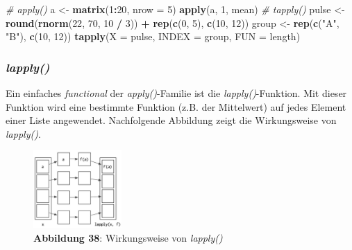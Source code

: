 \documentclass[]{article}
\newenvironment{Shaded}{\begin{snugshade}}{\end{snugshade}}
\newcommand{\KeywordTok}[1]{\textcolor[rgb]{0.13,0.29,0.53}{\textbf{#1}}}
\newcommand{\DataTypeTok}[1]{\textcolor[rgb]{0.13,0.29,0.53}{#1}}
\newcommand{\DecValTok}[1]{\textcolor[rgb]{0.00,0.00,0.81}{#1}}
\newcommand{\StringTok}[1]{\textcolor[rgb]{0.31,0.60,0.02}{#1}}
\newcommand{\CommentTok}[1]{\textcolor[rgb]{0.56,0.35,0.01}{\textit{#1}}}
\newcommand{\OperatorTok}[1]{\textcolor[rgb]{0.81,0.36,0.00}{\textbf{#1}}}
\newcommand{\NormalTok}[1]{#1}
\begin{document}
\begin{Shaded}
\begin{Highlighting}[]
  \CommentTok{# apply()}
\NormalTok{  a <-}\StringTok{ }\KeywordTok{matrix}\NormalTok{(}\DecValTok{1}\OperatorTok{:}\DecValTok{20}\NormalTok{, }\DataTypeTok{nrow =} \DecValTok{5}\NormalTok{)}
  \KeywordTok{apply}\NormalTok{(a, }\DecValTok{1}\NormalTok{, mean)}
  \CommentTok{# tapply()}
\NormalTok{  pulse <-}\StringTok{ }\KeywordTok{round}\NormalTok{(}\KeywordTok{rnorm}\NormalTok{(}\DecValTok{22}\NormalTok{, }\DecValTok{70}\NormalTok{, }\DecValTok{10} \OperatorTok{/}\StringTok{ }\DecValTok{3}\NormalTok{)) }\OperatorTok{+}\StringTok{ }\KeywordTok{rep}\NormalTok{(}\KeywordTok{c}\NormalTok{(}\DecValTok{0}\NormalTok{, }\DecValTok{5}\NormalTok{), }\KeywordTok{c}\NormalTok{(}\DecValTok{10}\NormalTok{, }\DecValTok{12}\NormalTok{))}
\NormalTok{  group <-}\StringTok{ }\KeywordTok{rep}\NormalTok{(}\KeywordTok{c}\NormalTok{(}\StringTok{"A"}\NormalTok{, }\StringTok{"B"}\NormalTok{), }\KeywordTok{c}\NormalTok{(}\DecValTok{10}\NormalTok{, }\DecValTok{12}\NormalTok{))}
  \KeywordTok{tapply}\NormalTok{(}\DataTypeTok{X =}\NormalTok{ pulse, }\DataTypeTok{INDEX =}\NormalTok{ group, }\DataTypeTok{FUN =}\NormalTok{ length)  }
\end{Highlighting}
\end{Shaded}

\subsubsection*{\texorpdfstring{\emph{lapply()}}{lapply()}}\label{lapply}

Ein einfaches \emph{functional} der \emph{apply()}-Familie ist die
\emph{lapply()}-Funktion. Mit dieser Funktion wird eine bestimmte
Funktion (z.B. der Mittelwert) auf jedes Element einer Liste angewendet.
Nachfolgende Abbildung zeigt die Wirkungsweise von \emph{lapply()}.

\begin{figure}
\centering
\includegraphics[width=0.30000\textwidth]{Images/10_lapply.PNG}
\caption{\textbf{Abbildung 38}: Wirkungsweise von \emph{lapply()}}
\end{figure}
\end{document}
